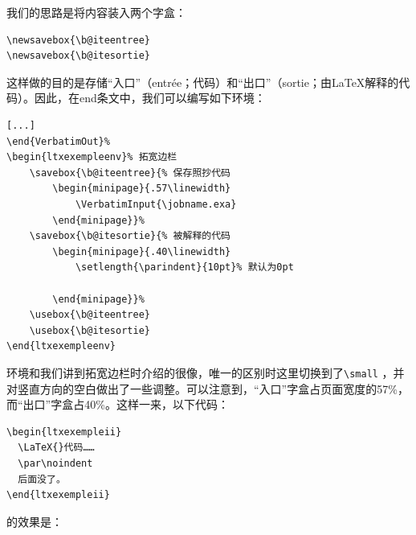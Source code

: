 我们的思路是将内容装入两个字盒：

\begin{dmd}
\begin{verbatim}
\newsavebox{\b@iteentree}
\newsavebox{\b@itesortie}
\end{verbatim}
\end{dmd}

这样做的目的是存储“入口”（entrée；代码）和“出口”（sortie；由\LaTeX 解释的代码）。因此，在end条文中，我们可以编写如下环境：

\begin{dmd}
\begin{verbatim}
[...]
\end{VerbatimOut}%
\begin{ltxexempleenv}% 拓宽边栏
    \savebox{\b@iteentree}{% 保存照抄代码
        \begin{minipage}{.57\linewidth}
            \VerbatimInput{\jobname.exa}
        \end{minipage}}%
    \savebox{\b@itesortie}{% 被解释的代码
        \begin{minipage}{.40\linewidth} 
            \setlength{\parindent}{10pt}% 默认为0pt
            
        \end{minipage}}%
    \usebox{\b@iteentree}
    \usebox{\b@itesortie}
\end{ltxexempleenv}
\end{verbatim}
\end{dmd}

环境和我们讲到拓宽边栏时介绍的很像，唯一的区别时这里切换到了\verb|\small|%
，并对竖直方向的空白做出了一些调整。可以注意到，“入口”字盒占页面宽度的57\%，而“出口”字盒占40\%。这样一来，以下代码：

\begin{dmd}
\begin{verbatim}
\begin{ltxexempleii}
  \LaTeX{}代码……
  \par\noindent
  后面没了。
\end{ltxexempleii}
\end{verbatim}
\end{dmd}

的效果是：

\makeatletter%

\newsavebox{\b@iteentree}
\newsavebox{\b@itesortie}

\newlength{\ltxexmargintdeborde}
\newlength{\ltxexmargextdeborde}
\setlength{\ltxexmargintdeborde}{5mm}
\setlength{\ltxexmargextdeborde}{10mm}

